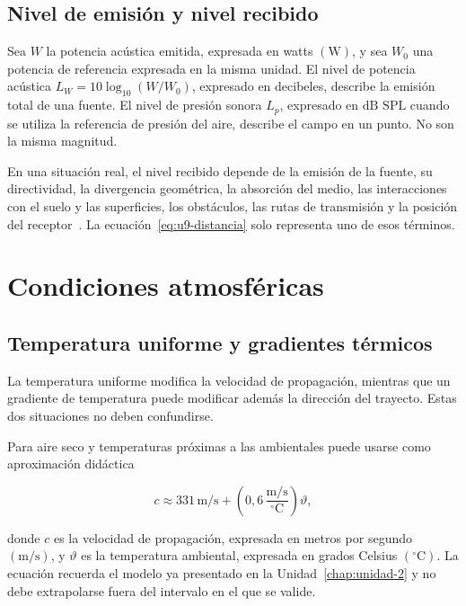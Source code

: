 \subsection{Nivel de emisión y nivel recibido}
\label{sec:u9-emision-recepcion}

Sea \(W\) la potencia acústica emitida, expresada en watts \((\text{W})\), y
sea \(W_0\) una potencia de referencia expresada en la misma unidad. El nivel
de potencia acústica \(L_W=10\log_{10}(W/W_0)\), expresado en decibeles,
describe la emisión total de una fuente. El nivel de presión sonora \(L_p\),
expresado en \(\text{dB SPL}\) cuando se utiliza la referencia de presión del
aire, describe el campo en un punto. No son la misma magnitud.

En una situación real, el nivel recibido depende de la emisión de la
fuente, su directividad, la divergencia geométrica, la absorción del medio, las
interacciones con el suelo y las superficies, los obstáculos, las rutas de
transmisión y la posición del receptor~\cite{xiangBlauert2021,iso9613_1_1993}. La ecuación~\eqref{eq:u9-distancia}
solo representa uno de esos términos.

\section{Condiciones atmosféricas}
\label{sec:u9-atmosfera}

\subsection{Temperatura uniforme y gradientes térmicos}
\label{sec:u9-temperatura}

La temperatura uniforme modifica la velocidad de propagación, mientras que un
gradiente de temperatura puede modificar además la dirección del trayecto.
Estas dos situaciones no deben confundirse.

Para aire seco y temperaturas próximas a las ambientales puede usarse
como aproximación didáctica~\cite{xiangBlauert2021,iso9613_1_1993}

\begin{equation}
    c\approx
    331\,\text{m}/\text{s}
    +\left(0{,}6\,
    \frac{\text{m}/\text{s}}{^{\circ}\text{C}}\right)\vartheta,
    \label{eq:u9-velocidad-temperatura}
\end{equation}

donde \(c\) es la velocidad de propagación, expresada en metros por segundo
\((\text{m}/\text{s})\), y \(\vartheta\) es la temperatura ambiental,
expresada en grados Celsius \((^{\circ}\text{C})\). La ecuación recuerda el
modelo ya presentado en la Unidad~\ref{chap:unidad-2} y no debe extrapolarse
fuera del intervalo
en el que se valide.

